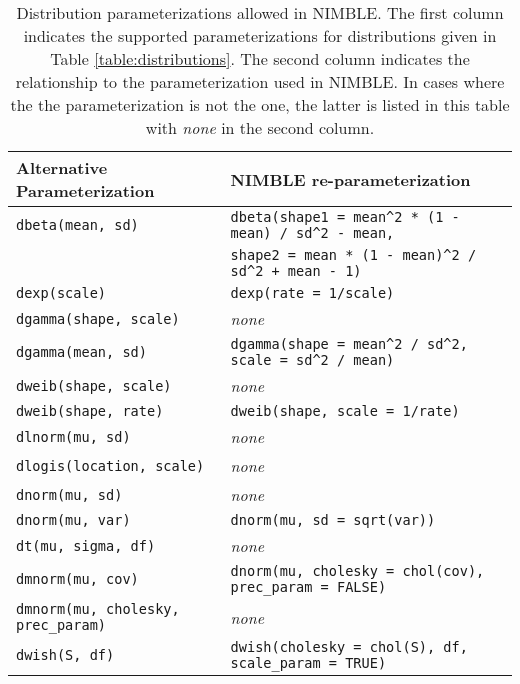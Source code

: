   \begin{center}
    \begin{longtable}{ll}
  \caption{Distribution parameterizations allowed in NIMBLE. The first
    column indicates the supported parameterizations for
    distributions given in Table \ref{table:distributions}. The second column indicates the
    relationship to the  parameterization used in
    NIMBLE. In cases where the the parameterization is not
    the  one, the latter is listed in this table with
    \textit{none} in the second column.} \label{table:distributions-alternates}\\
      \hline
      Alternative Parameterization & NIMBLE re-parameterization \\
      \hline \hline
\endhead
      \texttt{dbeta(mean, sd)} & \verb|dbeta(shape1 = mean^2 * (1 - mean) / sd^2 - mean,| \\
      & \verb|shape2 = mean * (1 - mean)^2 / sd^2 + mean - 1)| \\
      \texttt{dexp(scale)} & \texttt{dexp(rate = 1/scale)} \\
     \texttt{dgamma(shape, scale)} & \textit{none} \\
      \texttt{dgamma(mean, sd)} & \verb|dgamma(shape = mean^2 / sd^2, scale = sd^2 / mean)| \\
     \texttt{dweib(shape, scale)} & \textit{none} \\
     \texttt{dweib(shape, rate)} & \texttt{dweib(shape, scale = 1/rate)} \\
     \texttt{dlnorm(mu, sd)} & \textit{none} \\
     \texttt{dlogis(location, scale)} & \textit{none} \\
     \texttt{dnorm(mu, sd)} & \textit{none} \\
     \texttt{dnorm(mu, var)} & \texttt{dnorm(mu, sd = sqrt(var))} \\
     \texttt{dt(mu, sigma, df)} & \textit{none} \\
     \texttt{dmnorm(mu, cov)} & \texttt{dnorm(mu, cholesky = chol(cov), prec\_param = FALSE)} \\
     \texttt{dmnorm(mu, cholesky, prec\_param)} & \textit{none} \\
     \texttt{dwish(S, df)} & \texttt{dwish(cholesky = chol(S), df, scale\_param = TRUE)}\\ 
     \end{longtable}
  \end{center}
